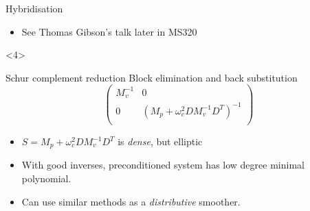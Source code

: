 \documentclass[presentation]{beamer}
\begin{document}
\begin{frame}[t]
\begin{onlyenv}
\begin{block}{Hybridisation}
\begin{itemize}
      \item See Thomas Gibson's talk later in MS320
      \end{itemize}
    \end{block}
  \end{onlyenv}
  \begin{onlyenv}<4>
    \begin{block}{Schur complement reduction}
      Block elimination and back substitution
      \begin{equation*}
        \begin{pmatrix}
          M_v^{-1} & 0 \\
          0 & (M_p + \omega_c^2 D M_v^{-1} D^T)^{-1}\\
        \end{pmatrix}
      \end{equation*}
    \begin{itemize}
    \item $S = M_p + \omega_c^2 D M_v^{-1} D^T$ is \emph{dense}, but
      elliptic
    \item With good inverses, preconditioned system has low degree
      minimal polynomial.
    \item Can use similar methods as a \emph{distributive} smoother.
    \end{itemize}
    \end{block}
  \end{onlyenv}
\end{frame}
\end{document}
